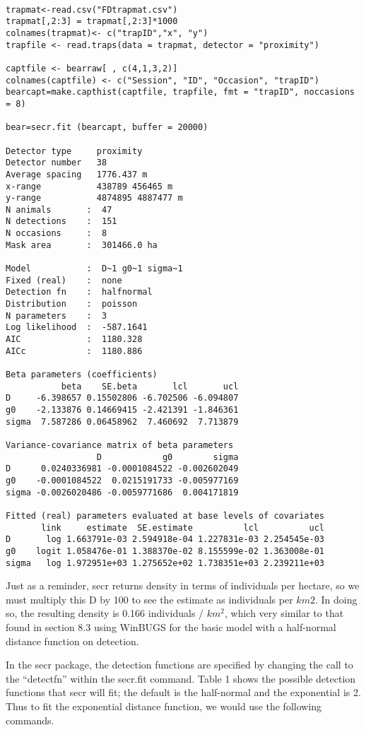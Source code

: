 {\small
\begin{verbatim}

trapmat<-read.csv("FDtrapmat.csv")
trapmat[,2:3] = trapmat[,2:3]*1000
colnames(trapmat)<- c("trapID","x", "y")
trapfile <- read.traps(data = trapmat, detector = "proximity")

captfile <- bearraw[ , c(4,1,3,2)] 
colnames(captfile) <- c("Session", "ID", "Occasion", "trapID")
bearcapt=make.capthist(captfile, trapfile, fmt = "trapID", noccasions = 8)

bear=secr.fit (bearcapt, buffer = 20000)

Detector type     proximity 
Detector number   38 
Average spacing   1776.437 m 
x-range           438789 456465 m 
y-range           4874895 4887477 m 
N animals       :  47  
N detections    :  151 
N occasions     :  8 
Mask area       :  301466.0 ha 

Model           :  D~1 g0~1 sigma~1 
Fixed (real)    :  none 
Detection fn    :  halfnormal 
Distribution    :  poisson 
N parameters    :  3 
Log likelihood  :  -587.1641 
AIC             :  1180.328 
AICc            :  1180.886 

Beta parameters (coefficients) 
           beta    SE.beta       lcl       ucl
D     -6.398657 0.15502806 -6.702506 -6.094807
g0    -2.133876 0.14669415 -2.421391 -1.846361
sigma  7.587286 0.06458962  7.460692  7.713879

Variance-covariance matrix of beta parameters 
                  D            g0        sigma
D      0.0240336981 -0.0001084522 -0.002602049
g0    -0.0001084522  0.0215191733 -0.005977169
sigma -0.0026020486 -0.0059771686  0.004171819

Fitted (real) parameters evaluated at base levels of covariates 
       link     estimate  SE.estimate          lcl          ucl
D       log 1.663791e-03 2.594918e-04 1.227831e-03 2.254545e-03
g0    logit 1.058476e-01 1.388370e-02 8.155599e-02 1.363008e-01
sigma   log 1.972951e+03 1.275652e+02 1.738351e+03 2.239211e+03

\end{verbatim}
}


Just as a reminder, secr returns density in terms of individuals per hectare, so we must multiply this D by 100 to see the estimate as individuals per $km2$.   In doing so, the resulting density is 0.166 individuals / $km ^2$, which very similar to that found in section 8.3 using WinBUGS for the basic model with a half-normal distance function on detection.  

In the secr package, the detection functions are specified by changing the call to the ``detectfn'' within the secr.fit command.   Table 1 shows the possible detection functions that secr will fit; the default is the half-normal and the exponential is 2.  Thus to fit the exponential distance function, we would use the following commands.

